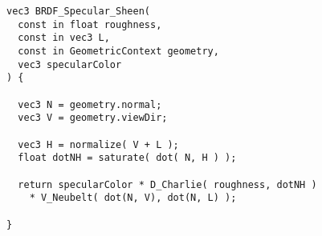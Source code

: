   \begin{lstlisting}[caption={BRDF del modelo de \textit{sheen} de ThreeJs}]
vec3 BRDF_Specular_Sheen(
  const in float roughness,
  const in vec3 L,
  const in GeometricContext geometry,
  vec3 specularColor
) {

  vec3 N = geometry.normal;
  vec3 V = geometry.viewDir;

  vec3 H = normalize( V + L );
  float dotNH = saturate( dot( N, H ) );

  return specularColor * D_Charlie( roughness, dotNH )
    * V_Neubelt( dot(N, V), dot(N, L) );

}
  \end{lstlisting}
